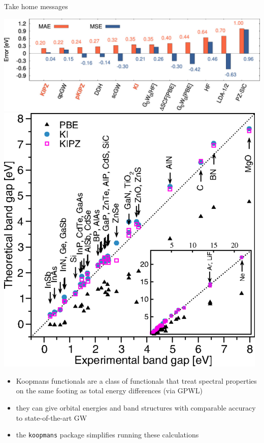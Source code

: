 \documentclass[xcolor=table,aspectratio=169]{beamer}
\numberwithin{equation}{section}
\begin{document}
\begin{frame}{Take home messages}

   \includegraphics[height=0.2\paperheight]{figures/colonna_2019_gw100_ip.jpeg}
   \hfill
   \includegraphics[height=0.2\paperheight]{figures/fig_nguyen_prx_bandgaps.png}
   \hfill

   \begin{itemize}
      \item Koopmans functionals are a class of functionals that treat spectral properties on the same footing as total energy differences (via GPWL)
      \item they can give orbital energies and band structures with comparable accuracy to state-of-the-art GW
      \item the \texttt{koopmans} package simplifies running these calculations
   \end{itemize}

\end{frame}
\end{document}

